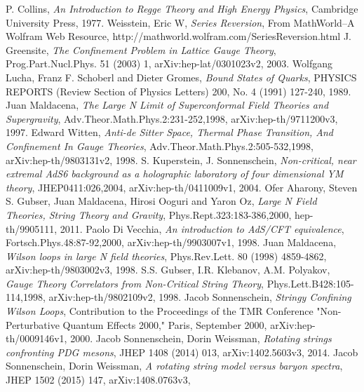 \documentclass[11pt,a4paper]{article}
\begin{document}
\begin{thebibliography}{9}
	P. Collins,
	\emph{An Introduction to Regge Theory and High Energy Physics},
	Cambridge University
Press,
	1977.
	Weisstein, Eric W,
	\emph{Series Reversion},
	From MathWorld--A Wolfram Web Resource,
	http://mathworld.wolfram.com/SeriesReversion.html
	J. Greensite,
	\emph{The Confinement Problem in Lattice Gauge Theory},
	Prog.Part.Nucl.Phys. 51 (2003) 1,
	arXiv:hep-lat/0301023v2,
	2003.
	Wolfgang Lucha, Franz F. Schoberl and Dieter Gromes,
	\emph{Bound States of Quarks},
	PHYSICS REPORTS (Review Section of Physics Letters) 200, No. 4 (1991) 127-240,
	1989.
	Juan Maldacena,
	\emph{The Large N Limit of Superconformal Field Theories and Supergravity},
	Adv.Theor.Math.Phys.2:231-252,1998,
	arXiv:hep-th/9711200v3,
	1997.
	Edward Witten,
	\emph{Anti-de Sitter Space, Thermal Phase Transition, And Confinement In Gauge Theories},
	Adv.Theor.Math.Phys.2:505-532,1998,
	arXiv:hep-th/9803131v2,
	1998.
	S. Kuperstein, J. Sonnenschein,
	\emph{Non-critical, near extremal AdS6 background as a holographic laboratory of four dimensional YM theory},
	JHEP0411:026,2004,
	arXiv:hep-th/0411009v1,
	2004.
	Ofer Aharony, Steven S. Gubser, Juan Maldacena, Hirosi Ooguri and Yaron Oz,
	\emph{Large N Field Theories, String Theory and Gravity},
	Phys.Rept.323:183-386,2000,
	hep-th/9905111,
	2011.
	Paolo Di Vecchia,
	\emph{An introduction to AdS/CFT equivalence},
	Fortsch.Phys.48:87-92,2000,
	arXiv:hep-th/9903007v1,
	1998.
	Juan Maldacena,
	\emph{Wilson loops in large N field theories},
	Phys.Rev.Lett. 80 (1998) 4859-4862,
	arXiv:hep-th/9803002v3,
	1998.
	S.S. Gubser, I.R. Klebanov, A.M. Polyakov,
	\emph{Gauge Theory Correlators from Non-Critical String Theory},
	Phys.Lett.B428:105-114,1998,
	arXiv:hep-th/9802109v2,
	1998.
	Jacob Sonnenschein,
	\emph{Stringy Confining Wilson Loops},
	Contribution to the Proceedings of the TMR Conference "Non-Perturbative Quantum Effects 2000," Paris, September 2000,
	arXiv:hep-th/0009146v1,
	2000.
	Jacob Sonnenschein, Dorin Weissman,
	\emph{Rotating strings confronting PDG mesons},
	JHEP 1408 (2014) 013,
	arXiv:1402.5603v3,
	2014.
	Jacob Sonnenschein, Dorin Weissman,
	\emph{A rotating string model versus baryon spectra},
	JHEP 1502 (2015) 147,
	arXiv:1408.0763v3,

\end{thebibliography}
\end{document}

